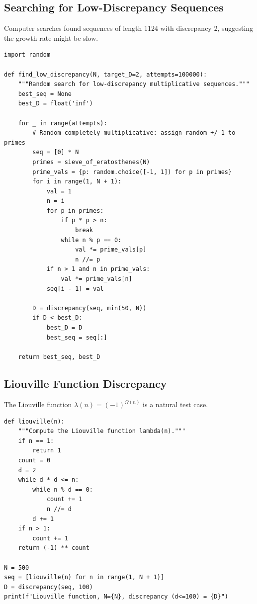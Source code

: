 \subsection{Searching for Low-Discrepancy Sequences}

Computer searches found sequences of length 1124 with discrepancy 2, suggesting the growth rate might be slow.

\begin{verbatim}
import random

def find_low_discrepancy(N, target_D=2, attempts=100000):
    """Random search for low-discrepancy multiplicative sequences."""
    best_seq = None
    best_D = float('inf')

    for _ in range(attempts):
        # Random completely multiplicative: assign random +/-1 to primes
        seq = [0] * N
        primes = sieve_of_eratosthenes(N)
        prime_vals = {p: random.choice([-1, 1]) for p in primes}
        for i in range(1, N + 1):
            val = 1
            n = i
            for p in primes:
                if p * p > n:
                    break
                while n % p == 0:
                    val *= prime_vals[p]
                    n //= p
            if n > 1 and n in prime_vals:
                val *= prime_vals[n]
            seq[i - 1] = val

        D = discrepancy(seq, min(50, N))
        if D < best_D:
            best_D = D
            best_seq = seq[:]

    return best_seq, best_D
\end{verbatim}

\subsection{Liouville Function Discrepancy}

The Liouville function $\lambda(n) = (-1)^{\Omega(n)}$ is a natural test case.

\begin{verbatim}
def liouville(n):
    """Compute the Liouville function lambda(n)."""
    if n == 1:
        return 1
    count = 0
    d = 2
    while d * d <= n:
        while n % d == 0:
            count += 1
            n //= d
        d += 1
    if n > 1:
        count += 1
    return (-1) ** count

N = 500
seq = [liouville(n) for n in range(1, N + 1)]
D = discrepancy(seq, 100)
print(f"Liouville function, N={N}, discrepancy (d<=100) = {D}")
\end{verbatim}

